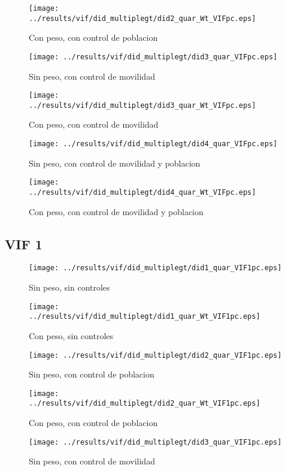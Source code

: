 \documentclass[11pt,letterpaper]{article}
\begin{document}
\begin{figure}[H]
\caption{Con peso, con control de poblacion}
\centering
\texttt{[image: ../results/vif/did\_multiplegt/did2\_quar\_Wt\_VIFpc.eps]}
\end{figure}
\begin{figure}[H]
\caption{Sin peso, con control de movilidad}
\centering
\texttt{[image: ../results/vif/did\_multiplegt/did3\_quar\_VIFpc.eps]}
\end{figure}

\begin{figure}[H]
\caption{Con peso, con control de movilidad}
\centering
\texttt{[image: ../results/vif/did\_multiplegt/did3\_quar\_Wt\_VIFpc.eps]}
\end{figure}
\begin{figure}[H]
\caption{Sin peso, con control de movilidad y poblacion}
\centering
\texttt{[image: ../results/vif/did\_multiplegt/did4\_quar\_VIFpc.eps]}
\end{figure}

\begin{figure}[H]
\caption{Con peso, con control de movilidad y poblacion}
\centering
\texttt{[image: ../results/vif/did\_multiplegt/did4\_quar\_Wt\_VIFpc.eps]}
\end{figure}

	\subsection{VIF 1}
\begin{figure}[H]
\caption{Sin peso, sin controles}
\centering
\texttt{[image: ../results/vif/did\_multiplegt/did1\_quar\_VIF1pc.eps]}
\end{figure}

\begin{figure}[H]
\caption{Con peso, sin controles}
\centering
\texttt{[image: ../results/vif/did\_multiplegt/did1\_quar\_Wt\_VIF1pc.eps]}
\end{figure}
\begin{figure}[H]
\caption{Sin peso, con control de poblacion}
\centering
\texttt{[image: ../results/vif/did\_multiplegt/did2\_quar\_VIF1pc.eps]}
\end{figure}

\begin{figure}[H]
\caption{Con peso, con control de poblacion}
\centering
\texttt{[image: ../results/vif/did\_multiplegt/did2\_quar\_Wt\_VIF1pc.eps]}
\end{figure}
\begin{figure}[H]
\caption{Sin peso, con control de movilidad}
\centering
\texttt{[image: ../results/vif/did\_multiplegt/did3\_quar\_VIF1pc.eps]}
\end{figure}
\end{document}
